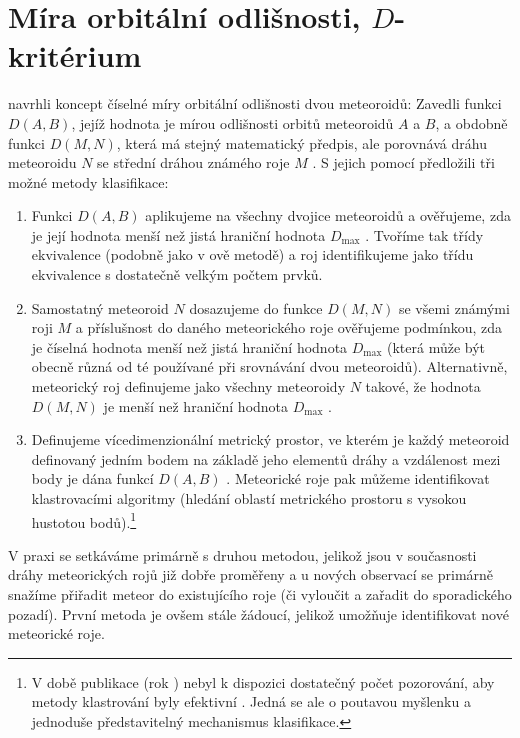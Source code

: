 \section{Míra orbitální odlišnosti, $D$-kritérium}%
\citeauthor{dsh} navrhli koncept číselné míry orbitální odlišnosti dvou meteoroidů: Zavedli funkci $D(A,B)$, jejíž hodnota je mírou odlišnosti orbitů meteoroidů $A$ a $B$, a obdobně funkci $D(M,N)$, která má stejný matematický předpis, ale porovnává dráhu meteoroidu $N$ se střední dráhou známého roje $M$ \cite{dsh}. S jejich pomocí předložili tři možné metody klasifikace:
\begin{enumerate}
    \item Funkci $D(A,B)$ aplikujeme na všechny dvojice meteoroidů a ověřujeme, zda je její hodnota menší než jistá hraniční hodnota $D_\text{max}$ \cite{dsh}. Tvoříme tak třídy ekvivalence (podobně jako v \citeauthor{radiosurvey}ově metodě) a roj identifikujeme jako třídu ekvivalence s dostatečně velkým počtem prvků.
    \item Samostatný meteoroid $N$ dosazujeme do funkce $D(M,N)$ se všemi známými roji $M$ a příslušnost do daného meteorického roje ověřujeme podmínkou, zda je číselná hodnota menší než jistá hraniční hodnota $D_\text{max}$ (která může být obecně různá od té používané při srovnávání dvou meteoroidů). Alternativně, meteorický roj definujeme jako všechny meteoroidy $N$ takové, že hodnota $D(M,N)$ je menší než hraniční hodnota $D_\text{max}$ \cite{dsh}.
    \item Definujeme vícedimenzionální metrický prostor, ve kterém je každý meteoroid definovaný jedním bodem na základě jeho elementů dráhy a vzdálenost mezi body je dána funkcí $D(A,B)$ \cite{dsh}. Meteorické roje pak můžeme identifikovat klastrovacími algoritmy (hledání oblastí metrického prostoru s vysokou hustotou bodů).\footnote{V době publikace \cite{dsh} (rok \citeyear{dsh}) nebyl k dispozici dostatečný počet pozorování, aby metody klastrování byly efektivní \cite{dsh}. Jedná se ale o poutavou myšlenku a jednoduše představitelný mechanismus klasifikace.}
\end{enumerate}

V praxi se setkáváme primárně s druhou metodou, jelikož jsou v současnosti dráhy meteorických rojů již dobře proměřeny a u nových observací se primárně snažíme přiřadit meteor do existujícího roje (či vyloučit a zařadit do sporadického pozadí). První metoda je ovšem stále žádoucí, jelikož umožňuje identifikovat nové meteorické roje.

